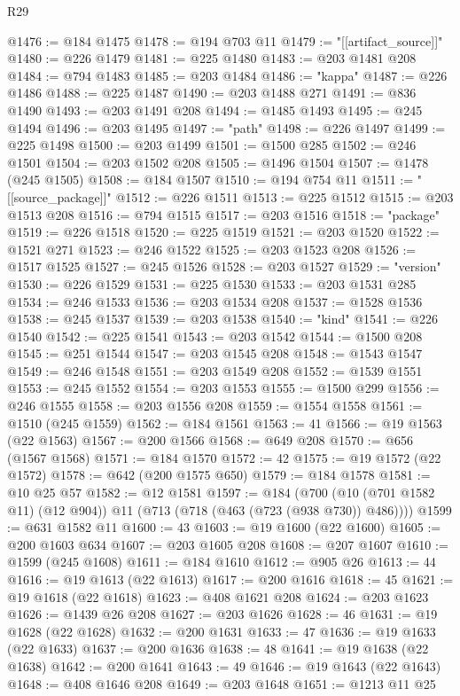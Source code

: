 \begin{lexlean}{R29}
\begin{coremodule}
@1476 := @184 @1475
@1478 := @194 @703 @11
@1479 := "[[artifact_source]]"
@1480 := @226 @1479
@1481 := @225 @1480
@1483 := @203 @1481 @208
@1484 := @794 @1483
@1485 := @203 @1484
@1486 := "kappa"
@1487 := @226 @1486
@1488 := @225 @1487
@1490 := @203 @1488 @271
@1491 := @836 @1490
@1493 := @203 @1491 @208
@1494 := @1485 @1493
@1495 := @245 @1494
@1496 := @203 @1495
@1497 := "path"
@1498 := @226 @1497
@1499 := @225 @1498
@1500 := @203 @1499
@1501 := @1500 @285
@1502 := @246 @1501
@1504 := @203 @1502 @208
@1505 := @1496 @1504
@1507 := @1478 (@245 @1505)
@1508 := @184 @1507
@1510 := @194 @754 @11
@1511 := "[[source_package]]"
@1512 := @226 @1511
@1513 := @225 @1512
@1515 := @203 @1513 @208
@1516 := @794 @1515
@1517 := @203 @1516
@1518 := "package"
@1519 := @226 @1518
@1520 := @225 @1519
@1521 := @203 @1520
@1522 := @1521 @271
@1523 := @246 @1522
@1525 := @203 @1523 @208
@1526 := @1517 @1525
@1527 := @245 @1526
@1528 := @203 @1527
@1529 := "version"
@1530 := @226 @1529
@1531 := @225 @1530
@1533 := @203 @1531 @285
@1534 := @246 @1533
@1536 := @203 @1534 @208
@1537 := @1528 @1536
@1538 := @245 @1537
@1539 := @203 @1538
@1540 := "kind"
@1541 := @226 @1540
@1542 := @225 @1541
@1543 := @203 @1542
@1544 := @1500 @208
@1545 := @251 @1544
@1547 := @203 @1545 @208
@1548 := @1543 @1547
@1549 := @246 @1548
@1551 := @203 @1549 @208
@1552 := @1539 @1551
@1553 := @245 @1552
@1554 := @203 @1553
@1555 := @1500 @299
@1556 := @246 @1555
@1558 := @203 @1556 @208
@1559 := @1554 @1558
@1561 := @1510 (@245 @1559)
@1562 := @184 @1561
@1563 := 41
@1566 := @19 @1563 (@22 @1563)
@1567 := @200 @1566
@1568 := @649 @208
@1570 := @656 (@1567 @1568)
@1571 := @184 @1570
@1572 := 42
@1575 := @19 @1572 (@22 @1572)
@1578 := @642 (@200 @1575 @650)
@1579 := @184 @1578
@1581 := @10 @25 @57
@1582 := @12 @1581
@1597 := @184
    (@700 (@10 (@701 @1582 @11) (@12 @904)) @11 (@713 (@718 (@463 (@723 (@938 @730)) @486))))
@1599 := @631 @1582 @11
@1600 := 43
@1603 := @19 @1600 (@22 @1600)
@1605 := @200 @1603 @634
@1607 := @203 @1605 @208
@1608 := @207 @1607
@1610 := @1599 (@245 @1608)
@1611 := @184 @1610
@1612 := @905 @26
@1613 := 44
@1616 := @19 @1613 (@22 @1613)
@1617 := @200 @1616
@1618 := 45
@1621 := @19 @1618 (@22 @1618)
@1623 := @408 @1621 @208
@1624 := @203 @1623
@1626 := @1439 @26 @208
@1627 := @203 @1626
@1628 := 46
@1631 := @19 @1628 (@22 @1628)
@1632 := @200 @1631
@1633 := 47
@1636 := @19 @1633 (@22 @1633)
@1637 := @200 @1636
@1638 := 48
@1641 := @19 @1638 (@22 @1638)
@1642 := @200 @1641
@1643 := 49
@1646 := @19 @1643 (@22 @1643)
@1648 := @408 @1646 @208
@1649 := @203 @1648
@1651 := @1213 @11 @25

\end{coremodule}
\end{lexlean}
